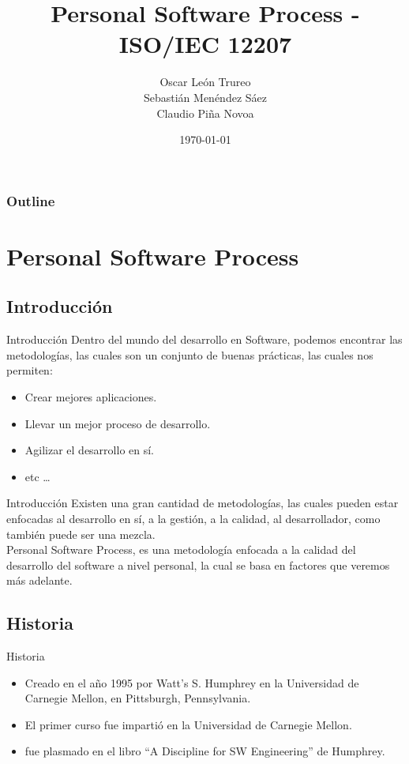 \documentclass[]{beamer}
\title [Ingeniería en Software]{Personal Software Process - ISO/IEC 12207}
\author[Grupo 1]{Oscar León Trureo\\Sebastián Menéndez Sáez\\Claudio Piña Novoa}
\date{\today}
\institute[]{Universidad Tecnol\'ogica Metropolitana}
\begin{document}
\begin{frame}
	\maketitle
\end{frame}

\begin{frame}
	\frametitle{Outline}
	\tableofcontents[]
\end{frame}

\section{Personal Software Process}
		\subsection{Introducci\'on}
			\begin{frame}{Introducci\'on}
				Dentro del mundo del desarrollo en Software, podemos encontrar las metodolog\'ias, las cuales son un conjunto de buenas pr\'acticas, las cuales nos permiten:\\ \pause
				\begin{itemize}
					\item Crear mejores aplicaciones.\pause
					\item Llevar un mejor proceso de desarrollo.\pause
					\item Agilizar el desarrollo en sí.\pause
					\item etc \ldots
				\end{itemize}				
			\end{frame}
			
			\begin{frame}{Introducci\'on}
				Existen una gran cantidad de metodologías, las cuales pueden estar enfocadas al desarrollo en sí, a la gestión, a la calidad, al desarrollador, como también puede ser una mezcla.\\
				\smallskip
				Personal Software Process, es una metodolog\'ia enfocada a la calidad del desarrollo del software a nivel personal, la cual se basa en factores que veremos más adelante.
			\end{frame}						
			
		\subsection{Historia}
			\begin{frame}{Historia}
				\pause
				\begin{itemize}
					\item Creado en el año 1995 por Watt's S. Humphrey en la Universidad de Carnegie Mellon, en Pittsburgh, Pennsylvania.\\ \pause
					\item El primer curso fue imparti\'o en la Universidad de Carnegie Mellon.\\ \pause
					\item fue plasmado en el libro ``A Discipline for SW Engineering'' de Humphrey.\\
				\end{itemize}
			\end{frame}
		
\end{document}
